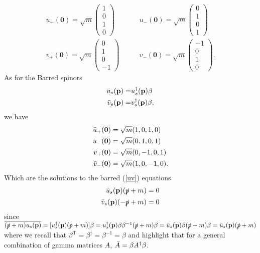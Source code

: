 \begin{equation}
\begin{aligned}
    u_{+}(\mathbf{0})=\sqrt{m}\left(\begin{array}{l}
1 \\
0 \\
1 \\
0
\end{array}\right)\qquad & u_{-}(\mathbf{0})=\sqrt{m}\left(\begin{array}{c}
0 \\
1 \\
0 \\
1
\end{array}\right) \\
v_{+}(\mathbf{0})=\sqrt{m}\left(\begin{array}{c}
0 \\
1 \\
0 \\
-1
\end{array}\right) \qquad & v_{-}(\mathbf{0})=\sqrt{m}\left(\begin{array}{c}
-1 \\
0 \\
1 \\
0
\end{array}\right) .
\end{aligned}
\label{uv_columm}
\end{equation}
As for the Barred spinors
\begin{equation}
\begin{aligned}
    \Bar{u}_s(\vb{p})=&u_s^\dagger(\vb{p})\beta\\
    \Bar{v}_s(\vb{p})=&v_s^\dagger(\vb{p})\beta,
\end{aligned}
\end{equation}
we have
\begin{equation}
    \begin{aligned}
        \Bar{u}_{+}(\vb{0})&=\sqrt{m}(1,0,1,0)\\
        \Bar{u}_{-}(\vb{0})&=\sqrt{m}(0,1,0,1)\\
        \Bar{v}_{+}(\vb{0})&=\sqrt{m}(0, -1, 0,1)\\
        \Bar{v}_{-}(\vb{0})&=\sqrt{m}(1 , 0 , -1 , 0).
    \end{aligned}
    \label{uv_row}
\end{equation}
Which are the solutions to the barred (\ref{uv}) equations
\begin{equation}
    \begin{aligned}
        \Bar{u}_s(\vb{p})(\slashed{p}+m)&=0\\
        \Bar{v}_s(\vb{p})(-\slashed{p}+m)&=0
    \end{aligned}
    \label{uv_bar}
\end{equation}
since $\overline{(\slashed{p}+m)u_s(\vb{p})}=[u_s^\dagger(\vb{p})(\slashed{p}+m)]\beta=u_s^\dagger(\vb{p})\beta\beta^{-1}(\slashed{p}+m)\beta=\bar{u}_s(\vb{p})\beta(\slashed{p}+m)\beta=\Bar{u}_s(\vb{p})(\slashed{p}+m)$ where we recall that $\beta^{\text{T}}=\beta^\dagger=\beta^{-1}=\beta$ and highlight that for a general combination of gamma matrices $A$, $\Bar{A}=\beta A^\dagger\beta$.
